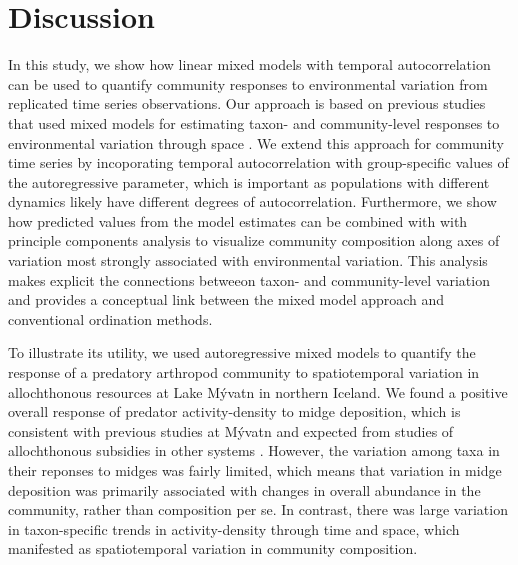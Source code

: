 

\section*{Discussion}

In this study, we show how linear mixed models with temporal autocorrelation can be used
to quantify community responses to environmental variation
from replicated time series observations.
Our approach is based on previous studies that used mixed models
for estimating taxon- and community-level responses to environmental variation
through space \citep{Jackson2012, Bartrons2015}.
We extend this approach for community time series by incoporating temporal autocorrelation
with group-specific values of the autoregressive parameter,
which is important as populations with different dynamics
likely have different degrees of autocorrelation.
Furthermore, we show how predicted values from the model estimates can be combined with
with principle components analysis \citep[following][]{Jackson2012} to visualize
community composition along axes of variation most strongly associated with environmental
variation.
This analysis makes explicit the connections betweeon taxon- and community-level variation
and provides a conceptual link between the mixed model approach
and conventional ordination methods.


To illustrate its utility,
we used autoregressive mixed models to quantify the response
of a predatory arthropod community to spatiotemporal variation in allochthonous resources
at Lake M\'{y}vatn in northern Iceland.
We found a positive overall response of predator activity-density to midge deposition,
which is consistent with previous studies at M\'{y}vatn
\citep{Hoekman2011, Dreyer2012, Sanchez2018, Hoekman2019}
and expected from studies of allochthonous subsidies in other systems
\citep{}.
However, the variation among taxa in their reponses to midges was fairly limited,
which means that variation in midge deposition was primarily associated with
changes in overall abundance in the community, rather than composition per se.
In contrast, there was large variation in taxon-specific trends in activity-density
through time and space,
which manifested as spatiotemporal variation in community composition.

